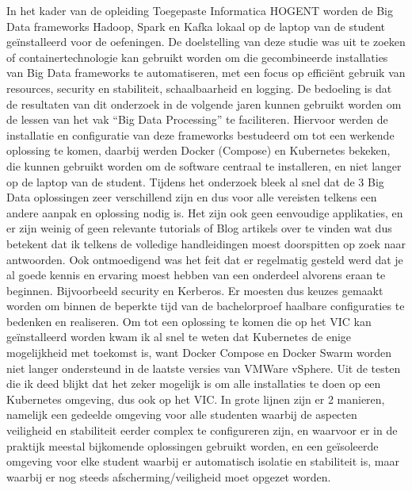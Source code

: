 In het kader van de opleiding Toegepaste Informatica HOGENT worden de Big Data frameworks Hadoop, Spark en Kafka lokaal op de laptop van de student geïnstalleerd voor de oefeningen.
De doelstelling van deze studie was uit te zoeken of containertechnologie kan gebruikt worden om die gecombineerde installaties van Big Data frameworks te automatiseren, met een focus op efficiënt gebruik van resources, security en stabiliteit, schaalbaarheid en logging. De bedoeling is dat de resultaten van dit onderzoek in de volgende jaren kunnen gebruikt worden om de lessen van het vak ``Big Data Processing'' te faciliteren.
\newline
\newline
Hiervoor werden de installatie en configuratie van deze frameworks bestudeerd om tot een werkende oplossing te komen, daarbij werden Docker (Compose) en Kubernetes bekeken, die kunnen gebruikt worden om de software centraal te installeren, en niet langer op de laptop van de student.
\newline
\newline
Tijdens het onderzoek bleek al snel dat de 3 Big Data oplossingen zeer verschillend zijn en dus voor alle vereisten telkens een andere aanpak en oplossing nodig is.
Het zijn ook geen eenvoudige applikaties, en er zijn weinig of geen relevante tutorials of Blog artikels over te vinden wat dus betekent dat ik telkens de volledige handleidingen moest doorspitten op zoek naar antwoorden. Ook ontmoedigend was het feit dat er regelmatig gesteld werd dat je al goede kennis en ervaring moest hebben van een onderdeel alvorens eraan te beginnen. Bijvoorbeeld security en Kerberos.
\newline
Er moesten dus keuzes gemaakt worden om binnen de beperkte tijd van de bachelorproef haalbare configuraties te bedenken en realiseren.
\newline
\newline
Om tot een oplossing te komen die op het VIC kan geïnstalleerd worden kwam ik al snel te weten dat Kubernetes de enige mogelijkheid met toekomst is, want Docker Compose en Docker Swarm worden niet langer ondersteund in de laatste versies van VMWare vSphere.
\newline
\newline
Uit de testen die ik deed blijkt dat het zeker mogelijk is om alle installaties te doen op een Kubernetes omgeving, dus ook op het VIC. In grote lijnen zijn er 2 manieren, namelijk een gedeelde omgeving voor alle studenten waarbij de aspecten veiligheid en stabiliteit eerder complex te configureren zijn, en waarvoor er in de praktijk meestal bijkomende oplossingen gebruikt worden, en een geïsoleerde omgeving voor elke student waarbij er automatisch isolatie en stabiliteit is, maar waarbij er nog steeds afscherming/veiligheid moet opgezet worden.

